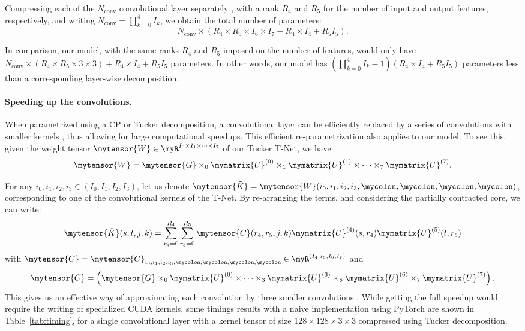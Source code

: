 \documentclass[10pt,twocolumn,letterpaper]{article}
\begin{document}
Compressing each of the \(N_{\text{conv}}\) convolutional layer separately \cite{yong2015compression}, with a rank \(R_{4}\) and \(R_{5}\) for the number of input and output features, respectively,  and writing \(N_{\text{conv}} = \prod_{k=0}^4 I_k\), we obtain the total number of parameters: 
\begin{equation}
N_{\text{conv}} \times \left( R_{4} \times R_{5} \times I_6 \times I_7  + R_{4}\times I_4 + R_{5} I_5 \right).
\end{equation}

In comparison, our model, with the same ranks \(R_4\) and \(R_5\) imposed on the number of features, would only have \( N_{\text{conv}} \times \left( R_{4} \times R_{5} \times 3 \times 3 \right) + R_{4}\times I_4 + R_{5} I_5 \) parameters. In other words, our model has \(\left(\prod_{k=0}^4 I_k - 1\right) \left( R_{4}\times I_4 + R_{5} I_5\right)\) parameters less than a corresponding layer-wise decomposition.

\paragraph{Speeding up the convolutions.} When parametrized using a CP or Tucker decomposition, a convolutional layer can be efficiently replaced by a series of convolutions with smaller kernels \cite{lebedev2014speeding,yong2015compression}, thus allowing for large computational speedups. This efficient re-parametrization also applies to our model. To see this, given the weight tensor \(\mytensor{W} \in \myR^{I_0 \times I_1 \times \cdots \times I_7} \) of our Tucker T-Net, we have
\[
\mytensor{W} = \mytensor{G} \times_0 \mymatrix{U}^{(0)} \times_1  \mymatrix{U}^{(1)} \times \cdots \times_7 \mymatrix{U}^{(7)}.
\]

For any \(i_0, i_1, i_2, i_3 \in (I_0, I_1, I_2, I_3)\), let us denote  
\(
\mytensor{\tilde K} = \mytensor{W}(i_0, i_1, i_2, i_3, \mycolon, \mycolon, \mycolon, \mycolon)
\), corresponding to one of the convolutional kernels of the T-Net. By re-arranging the terms, and considering the partially contracted core, we can write: 
\[
\mytensor{\tilde K}(s, t, j, k) = 
\sum_{r_4=0}^{R_4} \sum_{r_5=0}^{R_5} \mytensor{C}(r_4, r_5, j, k)  \mymatrix{U}^{(4)}(s, r_4) \mymatrix{U}^{(5)}(t, r_5)
\]
with \(\mytensor{C} = \mytensor{C}_{i_0, i_1, i_2, i_3, \mycolon, \mycolon, \mycolon, \mycolon} \in \myR^{(I_4, I_5, I_6, I_7)}\) and
\[
\mytensor{C} = \left(\mytensor{G} \times_0 \mymatrix{U}^{(0)} \times  \cdots \times_3  \mymatrix{U}^{(3)} \times_6 \mymatrix{U}^{(6)} \times_7 \mymatrix{U}^{(7)}\right).
\]
This gives us an effective way of approximating each convolution by three smaller convolutions \cite{yong2015compression}. While getting the full speedup would require the writing of specialized CUDA kernels, some timings results with a naive implementation using PyTorch are shown in Table~\ref{tab:timing}, for a single convolutional layer with a kernel tensor of size \(128 \times 128 \times 3 \times 3\) compressed using Tucker decomposition.
\end{document}
